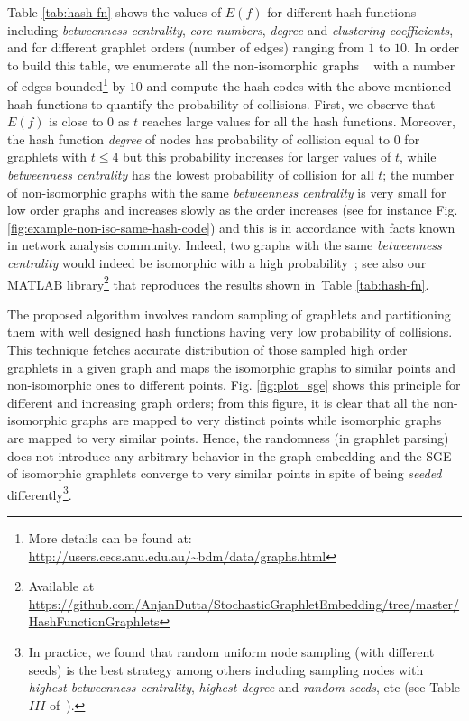 \documentclass[journal]{IEEEtran}
\theoremstyle{definition}
\newcommand{\fig}[1]{Fig. \ref{#1}}
\newcommand{\tab}[1]{Table \ref{#1}}
\begin{document}
\tab{tab:hash-fn} shows the values of $E(f)$ for different hash functions including \emph{betweenness centrality}, \emph{core numbers}, \emph{degree} and \emph{clustering coefficients}, and for different graphlet orders (number of edges) ranging from $1$ to $10$. In order to build this table, we enumerate all the non-isomorphic graphs {~\cite{McKay2014}} with a number of edges bounded\footnote{{More details can be found at: \url{http://users.cecs.anu.edu.au/~bdm/data/graphs.html}}} by $10$ and compute the hash codes with the above mentioned hash functions to quantify the probability of collisions. First, we observe that $E(f)$ is close to $0$ as $t$ reaches large values for all the hash functions. Moreover, the hash function \emph{degree} of nodes has probability of collision equal to $0$ for graphlets with $t\leq 4$ but this probability increases for larger values of $t$, while \emph{betweenness centrality} has the lowest probability of collision for all $t$; the number of non-isomorphic graphs with the same \emph{betweenness centrality} is very small for low order graphs and increases slowly as the order increases (see for instance \fig{fig:example-non-iso-same-hash-code}) and this is in accordance with facts known in network analysis community. Indeed, two graphs with the same \emph{betweenness centrality} would indeed be isomorphic with a high probability~\cite{Newman2005,Comellas2008}; see also our MATLAB library\footnote{Available at \url{https://github.com/AnjanDutta/StochasticGraphletEmbedding/tree/master/HashFunctionGraphlets}} that reproduces the results shown in~\tab{tab:hash-fn}.

The proposed algorithm involves random sampling of graphlets and partitioning them with well designed hash functions having very low probability of collisions. This technique fetches accurate distribution of those sampled high order graphlets in a given graph and maps the isomorphic graphs to similar points and non-isomorphic ones to different points. \fig{fig:plot_sge} shows this principle for different and increasing graph orders; from this figure, it is clear that all the non-isomorphic graphs are mapped to very distinct points while isomorphic graphs are mapped to very similar points. Hence, the randomness (in graphlet parsing) does not introduce any arbitrary behavior in the graph embedding and the SGE of isomorphic graphlets converge to very similar points in spite of being {\it seeded} differently\footnote{In practice, we found that random uniform node sampling (with different seeds) is the best strategy among others including sampling nodes with \emph{highest betweenness centrality}, \emph{highest degree} and \emph{random seeds}, etc (see Table $III$ of~\cite{Dutta2018SGEsupp}).}.
\end{document}

